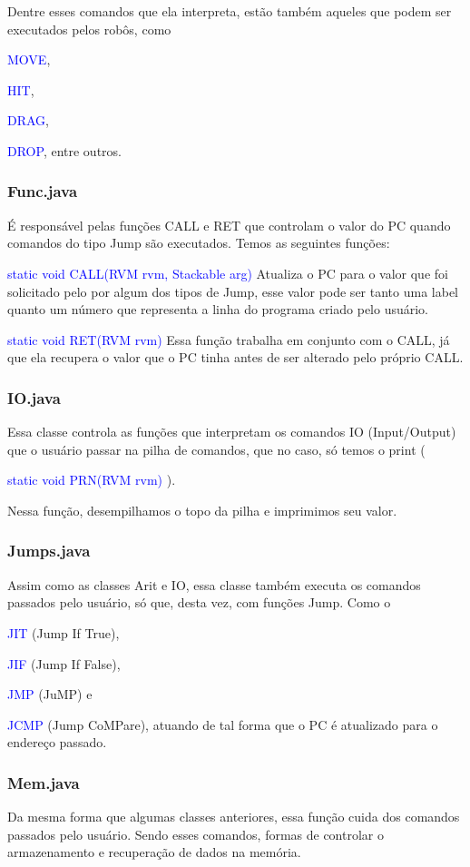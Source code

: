 \documentclass[a4paper]{article}
\begin{document}
{{{{{{{{		    Dentre esses comandos que ela interpreta, estão também
		    aqueles que podem ser executados pelos robôs, como
		    {\textcolor{blue}{MOVE}, 
		    {\textcolor{blue}{HIT}, 
		    {\textcolor{blue}{DRAG}, 
		    {\textcolor{blue}{DROP}, 
		    entre outros.
		    
		\subsubsection{ Func.java }
		    É responsável pelas funções CALL e RET que controlam
		    o valor do PC quando comandos do tipo Jump são
		    executados.
		    Temos as seguintes funções:
		    
		    {\textcolor{blue}{ static void CALL(RVM rvm, 
		    Stackable arg) }
		    Atualiza o PC para o valor que foi solicitado pelo
		    por algum dos tipos de Jump, esse valor pode ser
		    tanto uma label quanto um número que representa
		    a linha do programa criado pelo usuário.
		    
		    {\textcolor{blue}{ static void RET(RVM rvm) }
		    Essa função trabalha em conjunto com o CALL,
		    já que ela recupera o valor que o PC tinha antes de
		    ser alterado pelo próprio CALL.
		
		\subsubsection{ IO.java }
		    Essa classe controla as funções que interpretam
		    os comandos IO (Input/Output) que o usuário 
		    passar na pilha de comandos, que no caso, só
		    temos o print (
		    {\textcolor{blue}{ static void PRN(RVM rvm) }
		    ). 
		    
		    Nessa função, desempilhamos o topo da pilha e
		    imprimimos seu valor.
		
		\subsubsection{ Jumps.java }
		    Assim como as classes Arit e IO, essa classe
		    também executa os comandos passados pelo usuário,
		    só que, desta vez, com funções Jump. Como o 
		    {\textcolor{blue}{JIT}  (Jump If True), 
		    {\textcolor{blue}{JIF}  (Jump If False), 
		    {\textcolor{blue}{JMP}  (JuMP) e
		    {\textcolor{blue}{JCMP} (Jump CoMPare),
		    atuando de tal forma que
		    o PC é atualizado para o endereço passado.
		    
		\subsubsection{ Mem.java }
		    Da mesma forma que algumas classes anteriores, essa
		    função cuida dos comandos passados pelo usuário.
		    Sendo esses comandos, formas de controlar o
		    armazenamento e recuperação de dados na memória.
		    
}}}}}}}}}}}}}}}}}}}
\end{document}
